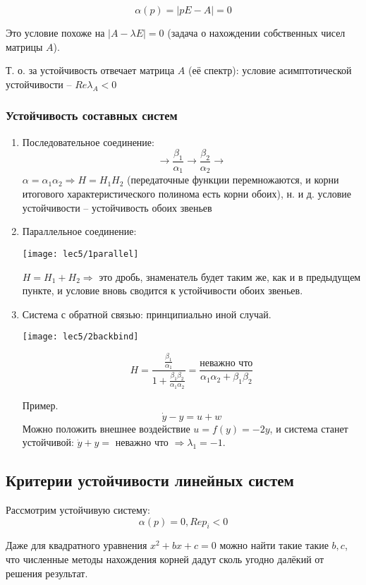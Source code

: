 \documentclass[main.tex]{subfiles}
\begin{document}
$$ \alpha(p) = |pE - A| = 0 $$

Это условие похоже на $ |A - \lambda E| = 0 $ (задача о нахождении собственных чисел матрицы $ A $).

Т. о. за устойчивость отвечает матрица $ A $ (её спектр): условие асимптотической устойчивости -- $ \boxed{ Re \lambda_A < 0 } $

\subsubsection{Устойчивость составных систем}

\begin{enumerate}[noitemsep]
	\item Последовательное соединение:
     $$ \rightarrow \boxed{\frac{\beta_1}{\alpha_1}} \rightarrow \boxed{\frac{\beta_2}{\alpha_2}} \rightarrow $$
     $\alpha = \alpha_1 \alpha_2 \Rightarrow H = H_1 H_2$ (передаточные функции перемножаются, и корни итогового характеристического полинома есть корни обоих), н. и д. условие устойчивости -- устойчивость обоих звеньев
	\item Параллельное соединение:

          \texttt{[image: lec5/1parallel]}

     $ H = H_1 + H_2 \Rightarrow $ это дробь, знаменатель будет таким же, как и в предыдущем пункте, и условие вновь сводится к устойчивости обоих звеньев.
	\item Система с обратной связью: принципиально иной случай.

    \texttt{[image: lec5/2backbind]}

    $$ H = \frac{\frac{\beta_1}{\alpha_1}}{1 +  \frac{\beta_1 \beta_2}{\alpha_1 \alpha_2}} = \frac{\text{неважно что}}{\alpha_1 \alpha_2 + \beta_1 \beta_2} $$

    Пример.
    $$ \dot y - y = u + w $$
    Можно положить внешнее воздействие $ u = f(y) = -2y $, и система станет устойчивой: $ \dot y + y = \text{ неважно что } \Rightarrow \lambda_1 = -1 $.
\end{enumerate}

\subsection{ Критерии устойчивости линейных систем }
Рассмотрим устойчивую систему:
$$ \alpha(p) = 0, Re p_i < 0 $$

Даже для квадратного уравнения $ x^2 + bx + c = 0 $ можно найти такие такие $b,c$, что численные методы нахождения корней дадут сколь угодно далёкий от решения результат.
\end{document}
